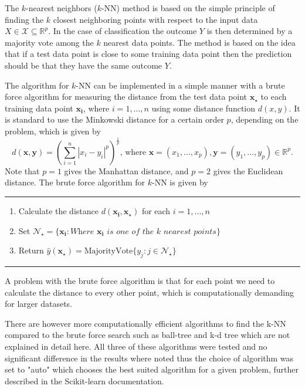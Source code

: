 \documentclass[../../project.tex]{subfiles}
\begin{document}
	The $k$-nearest neighbors ($k$-NN) method is based on the simple principle of finding the $k$ closest neighboring points with respect to the input data $X \in \mathcal{X} \subseteq \mathbb{R}^p$. In the case of classification the outcome $Y$ is then determined by a majority vote among the $k$ nearest data points. The method is based on the idea that if a test data point is close to some training data point then the prediction should be that they have the same outcome $Y$.
	
	The algorithm for $k$-NN can be implemented in a simple manner with a brute force algorithm for measuring the distance from the test data point $\boldsymbol{x_{\star}}$ to each training data point $\boldsymbol{x_{i}}$, where $i = 1,...,n$ using some distance function $d(x,y)$. It is standard to use the Minkowski distance for a certain order $p$, depending on the problem, which is given by
	\begin{equation}
	d(\boldsymbol{x},\boldsymbol{y}) = \left( \sum_{i=1}^{n} |x_{i} - y_{i}|^{p} \right)^{\frac{1}{p}}\text{, where } \boldsymbol{x} = (x_1,...,x_p),\boldsymbol{y}=(y_1,...,y_p)
	\in \mathbb{R}^p.
	\end{equation}
	Note that $p=1$ gives the Manhattan distance, and $p=2$ gives the Euclidean distance. The brute force algorithm for $k$-NN is given by\cite{Kursbok}
	\par\noindent\rule{\textwidth}{0.4pt}
	\begin{enumerate}
		\item Calculate the distance $d(\boldsymbol{x_{i}},\boldsymbol{x_{\star}})$ for each $i = 1,...,n$
		\item Set $\mathcal{N}_{\star} = \{ \boldsymbol{x_i}: \textit{Where } \boldsymbol{x_i} \textit{ is one of the k nearest points} \}$
		\item Return $\hat{y}(\boldsymbol{x_{\star}}) = \text{MajorityVote}\{y_j : j \in \mathcal{N}_{\star}\} $
	\end{enumerate}
	\par\noindent\rule{\textwidth}{0.4pt}
	
	
	A problem with the brute force algorithm is that for each point we need to calculate the distance to every other point, which is computationally demanding for larger datasets.
	
	There are however more computationally  efficient algorithms to find the k-NN compared to the brute force search such as ball-tree and k-d tree which are not explained in detail here. All three of these algorithms were tested and no significant difference in the results where noted thus the choice of algorithm was set to "auto" which chooses the best suited algorithm for a given problem, further described in the Scikit-learn documentation. \cite{sklearn} 
	
\end{document}
